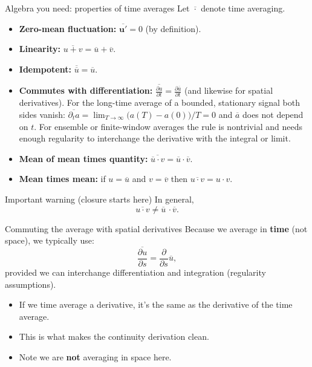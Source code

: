 \documentclass[aspectratio=169,11pt]{beamer}
\newcommand{\uu}{\bm{u}}
\newcommand{\avg}[1]{\overline{#1}}
\renewcommand{\up}{\uu'} %
\begin{document}
\begin{frame}{Algebra you need: properties of time averages}
Let $\avg{\cdot}$ denote time averaging.

\begin{itemize}
  \item \textbf{Zero-mean fluctuation:} $\avg{\up}=0$ (by definition).
  \item \textbf{Linearity:} $\avg{u+v}=\avg{u}+\avg{v}$.
  \item \textbf{Idempotent:} $\avg{\avg{u}}=\avg{u}$.
  \item \textbf{Commutes with differentiation:}
  $\displaystyle\avg{\frac{\partial a}{\partial t}}=\frac{\partial \avg{a}}{\partial t}$
  (and likewise for spatial derivatives).
  For the long-time average of a bounded, stationary signal both sides vanish: $\avg{\partial_t a}=\lim_{T\to\infty}\big(a(T)-a(0)\big)/T=0$ and $\avg{a}$ does not depend on $t$. For ensemble or finite-window averages the rule is nontrivial and needs enough regularity to interchange the derivative with the integral or limit.
  \item \textbf{Mean of mean times quantity:} 
  $\avg{\avg{u}\cdot v}=\avg{u}\cdot \avg{v}$.
  \item \textbf{Mean times mean:} if $u=\avg{u}$ and $v=\avg{v}$ then $\avg{u\cdot v} = u \cdot v$.
\end{itemize}
\vfill

\begin{block}{Important warning (closure starts here)}
In general,
\[
\avg{u \cdot v}\neq \avg{u}\, \cdot \avg{v}.
\]
\end{block}


\end{frame}

\begin{frame}{Commuting the average with spatial derivatives}
Because we average in \textbf{time} (not space), we typically use:
\[
\avg{\frac{\partial u}{\partial s}}
=
\frac{\partial}{\partial s}\avg{u},
\]
provided we can interchange differentiation and integration (regularity assumptions).

\begin{itemize}
  \item If we time average a derivative, it's the same as the derivative of the time average.
  \item This is what makes the continuity derivation clean.
  \item Note we are \textbf{not} averaging in space here.
\end{itemize}

\end{frame}
\end{document}
